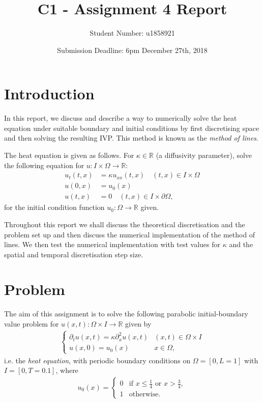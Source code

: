 \documentclass[a4paper,11pt]{article}
\title{C1 - Assignment 4 Report}
\author{Student Number: u1858921}
\date{Submission Deadline: 6pm December 27th, 2018}
\theoremstyle{break}
\theoremstyle{break2}
\theoremstyle{break}
\theoremstyle{break2}
\newcommand{\R}{\mathbb{R}}
\begin{document}
	\maketitle
	\tableofcontents
	
\section{Introduction}
In this report, we discuss and describe a way to numerically solve the heat equation under suitable boundary and initial conditions by first discretising space and then solving the resulting IVP. This method is known as the \emph{method of lines}.
\begin{mdframed}
	The heat equation is given as follows. For $ \kappa \in \R $ (a diffusivity parameter), solve the following equation for $ u : I \times \Omega \to \R $:
	\begin{align*}
	u_t(t,x) &= \kappa u_{xx}(t,x) \quad (t,x) \in I \times \Omega \\
	u(0,x) &= u_0(x) \\
	u(t,x) &= 0 \quad (t,x) \in I \times \partial\Omega,
	\end{align*}
	for the initial condition function $ u_0 : \Omega \to \R $ given.
\end{mdframed} 
\noindent
Throughout this report we shall discuss the theoretical discretisation and the problem set up and then discuss the numerical implementation of the method of lines. We then test the numerical implementation with test values for $ \kappa $ and the spatial and temporal discretisation step size.

\section{Problem}
The aim of this assignment is to solve the following parabolic initial-boundary value problem for $ u(x,t) : \Omega \times I \to \R $ given by
\begin{align}
\begin{cases}
\partial_t u(x,t) = \kappa \partial_x^2 u(x,t) & (x,t) \in \Omega \times I \\
u(x,0) = u_0(x) & x \in \Omega,
\end{cases}
\end{align}
i.e. the \emph{heat equation}, with periodic boundary conditions on $ \Omega = [0,L = 1] $ with $ I = [0, T = 0.1] $, where
\begin{align*}
u_0(x) =
\begin{cases}
0 & \text{if } x \leq \frac{1}{4} \text{ or } x > \frac{3}{4}, \\
1 & \text{otherwise}.
\end{cases}
\end{align*}
\end{document}
